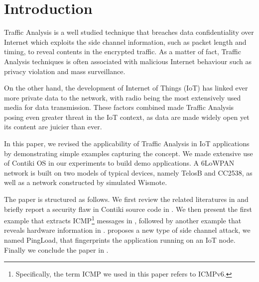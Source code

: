 \section{Introduction}
Traffic Analysis is a well studied technique that breaches data confidentiality over Internet which exploits the side channel information, such as packet length and timing, to reveal contents in the encrypted traffic. As a matter of fact, Traffic Analysis techniques is often associated with malicious Internet behaviour such as privacy violation and mass surveillance. 


On the other hand, the development of Internet of Things (IoT) has linked ever more private data to the network, with radio being the most extensively used media for data transmission. These factors combined made Traffic Analysis posing even greater threat in the IoT context, as data are made widely open yet its content are juicier than ever.


In this paper, we revised the applicability of Traffic Analysis in IoT applications by demonstrating simple examples capturing the concept. We made extensive use of Contiki OS\cite{Contiki} in our experiments to build demo applications. A 6LoWPAN\cite{rfc4944} network is built on two models of typical devices, namely TelosB\cite{TelosB} and CC2538\cite{CC2538}, as well as a network constructed by simulated Wismote\cite{Wismote}. 

The paper is structured as follows. We first review the related literatures in  and briefly report a security flaw in Contiki source code in . We then present the first example that extracts ICMP\footnote{Specifically, the term ICMP we used in this paper refers to ICMPv6.}\cite{rfc4443} messages in , followed by another example that reveals hardware information in .  proposes a new type of side channel attack, we named PingLoad, that fingerprints the application running on an IoT node. Finally we conclude the paper in .

